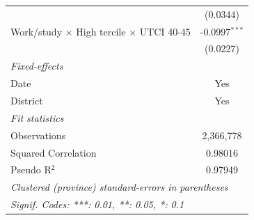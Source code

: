 \begin{table}[htbp]
\begin{tabular}{lc}
                                                                        & (0.0344)\\   
      Work/study $\times$ High tercile $\times$ UTCI 40-45              & -0.0997$^{***}$\\   
                                                                        & (0.0227)\\   
      \midrule
      \emph{Fixed-effects}\\
      Date                                                              & Yes\\  
      District                                                          & Yes\\  
      \midrule
      \emph{Fit statistics}\\
      Observations                                                      & 2,366,778\\  
      Squared Correlation                                               & 0.98016\\  
      Pseudo R$^2$                                                      & 0.97949\\  
      \midrule \midrule
      \multicolumn{2}{l}{\emph{Clustered (province) standard-errors in parentheses}}\\
      \multicolumn{2}{l}{\emph{Signif. Codes: ***: 0.01, **: 0.05, *: 0.1}}\\
   \end{tabular}
\end{table}


